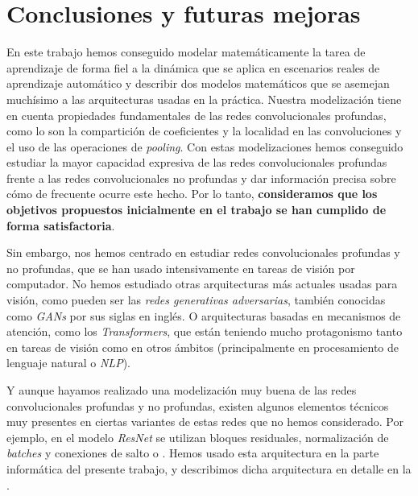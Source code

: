 \chapter{Conclusiones y futuras mejoras} \label{chapter:conclusiones_trabajo_futuro}

En este trabajo hemos conseguido modelar matemáticamente la tarea de aprendizaje de forma fiel a la dinámica que se aplica en escenarios reales de aprendizaje automático y describir dos modelos matemáticos que se asemejan muchísimo a las arquitecturas usadas en la práctica. Nuestra modelización tiene en cuenta propiedades fundamentales de las redes convolucionales profundas, como lo son la compartición de coeficientes y la localidad en las convoluciones y el uso de las operaciones de \textit{pooling}. Con estas modelizaciones hemos conseguido estudiar la mayor capacidad expresiva de las redes convolucionales profundas frente a las redes convolucionales no profundas y dar información precisa sobre cómo de frecuente ocurre este hecho. Por lo tanto, \textbf{consideramos que los objetivos propuestos inicialmente en el trabajo se han cumplido de forma satisfactoria}.

Sin embargo, nos hemos centrado en estudiar redes convolucionales profundas y no profundas, que se han usado intensivamente en tareas de visión por computador. No hemos estudiado otras arquitecturas más actuales usadas para visión, como pueden ser las \textit{redes generativas adversarias}, también conocidas como \textit{GANs} por sus siglas en inglés. O arquitecturas basadas en mecanismos de atención, como los \textit{Transformers}, que están teniendo mucho protagonismo tanto en tareas de visión como en otros ámbitos (principalmente en procesamiento de lenguaje natural o \textit{NLP}).

Y aunque hayamos realizado una modelización muy buena de las redes convolucionales profundas y no profundas, existen algunos elementos técnicos muy presentes en ciertas variantes de estas redes que no hemos considerado. Por ejemplo, en el modelo \textit{ResNet} se utilizan bloques residuales, normalización de \textit{batches} y conexiones de salto o . Hemos usado esta arquitectura en la parte informática del presente trabajo, y describimos dicha arquitectura en detalle en la .

